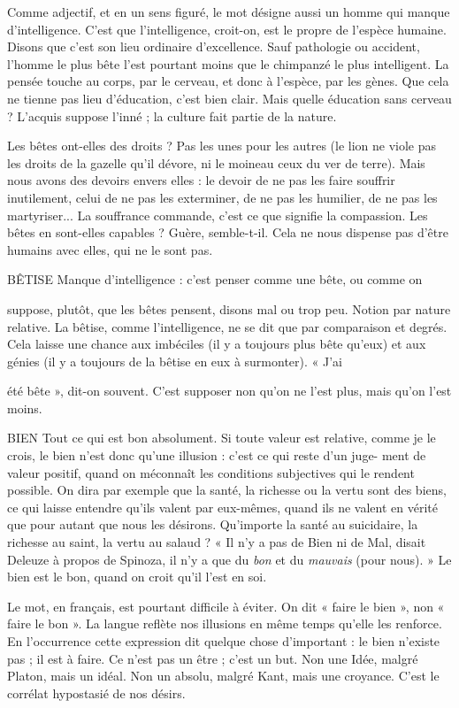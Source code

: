 Comme adjectif, et en un sens figuré, le mot désigne aussi un homme
qui manque d'intelligence. C’est que l'intelligence, croit-on, est le propre de
l'espèce humaine. Disons que c’est son lieu ordinaire d’excellence. Sauf pathologie
ou accident, l’homme le plus bête l’est pourtant moins que le chimpanzé
le plus intelligent. La pensée touche au corps, par le cerveau, et donc à l’espèce,
par les gènes. Que cela ne tienne pas lieu d'éducation, c’est bien clair. Mais
quelle éducation sans cerveau ? L’acquis suppose l’inné ; la culture fait partie de
la nature.

Les bêtes ont-elles des droits ? Pas les unes pour les autres (le lion ne viole
pas les droits de la gazelle qu’il dévore, ni le moineau ceux du ver de terre).
Mais nous avons des devoirs envers elles : le devoir de ne pas les faire souffrir
inutilement, celui de ne pas les exterminer, de ne pas les humilier, de ne pas les
martyriser... La souffrance commande, c’est ce que signifie la compassion. Les
bêtes en sont-elles capables ? Guère, semble-t-il. Cela ne nous dispense pas
d’être humains avec elles, qui ne le sont pas.

BÊTISE Manque d’intelligence : c’est penser comme une bête, ou comme on

suppose, plutôt, que les bêtes pensent, disons mal ou trop peu.
Notion par nature relative. La bêtise, comme l'intelligence, ne se dit que par
comparaison et degrés. Cela laisse une chance aux imbéciles (il y a toujours plus
bête qu’eux) et aux génies (il y a toujours de la bêtise en eux à surmonter). « J'ai

été bête », dit-on souvent. C’est supposer non qu’on ne l’est plus, mais qu’on
l'est moins.

BIEN Tout ce qui est bon absolument. Si toute valeur est relative, comme je
le crois, le bien n’est donc qu’une illusion : c’est ce qui reste d’un juge-
ment de valeur positif, quand on méconnaît les conditions subjectives qui le
rendent possible. On dira par exemple que la santé, la richesse ou la vertu sont
des biens, ce qui laisse entendre qu’ils valent par eux-mêmes, quand ils ne
valent en vérité que pour autant que nous les désirons. Qu'importe la santé au
suicidaire, la richesse au saint, la vertu au salaud ? « Il n’y a pas de Bien ni de
Mal, disait Deleuze à propos de Spinoza, il n’y a que du {\it bon} et du {\it mauvais}
(pour nous). » Le bien est le bon, quand on croit qu’il l’est en soi.

Le mot, en français, est pourtant difficile à éviter. On dit « faire le bien »,
non « faire le bon ». La langue reflète nos illusions en même temps qu’elle les
renforce. En l’occurrence cette expression dit quelque chose d’important : le
bien n'existe pas ; il est à faire. Ce n’est pas un être ; c’est un but. Non une
Idée, malgré Platon, mais un idéal. Non un absolu, malgré Kant, mais une
croyance. C’est le corrélat hypostasié de nos désirs.

